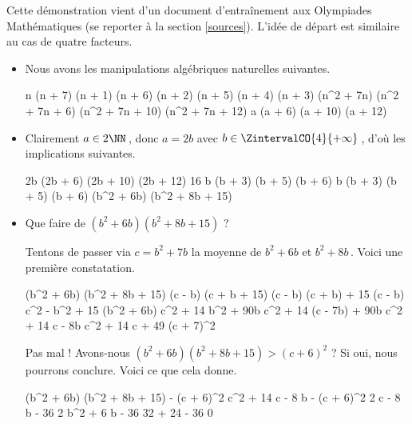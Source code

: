 Cette démonstration vient d'un document d'entraînement aux Olympiades Mathématiques (se reporter à la section \ref{sources}).
L'idée de départ est similaire au cas de quatre facteurs.

\begin{itemize}
	\item Nous avons les manipulations algébriques naturelles suivantes.

    \medskip
    \noindent\kern-6pt%
    \begin{stepcalc}[style = sar]
    \explnext{}
    	n (n + 7) \cdot (n + 1) (n + 6) \cdot (n + 2) (n + 5) \cdot (n + 4) (n + 3) 
    \explnext{}
    	(n^2 + 7n) (n^2 + 7n + 6) (n^2 + 7n + 10) (n^2 + 7n + 12) 
    	a (a + 6) (a + 10) (a + 12)
    \end{stepcalc}


	\item Clairement $a \in 2 \NN$\,, donc $a = 2b$ avec $b \in \ZintervalCO{4}{+\infty}$\,, d'où les implications suivantes.

    \medskip
    \noindent\kern-10pt%
    \begin{stepcalc}[style = ar*, ope=\implies]
    	 \in \NNssquare
    \explnext{}
    	2b (2b + 6) (2b + 10) (2b + 12) \in \NNssquare
    \explnext{}
    	16 b (b + 3) (b + 5) (b + 6) \in \NNssquare
    	b (b + 3) (b + 5) (b + 6) \in \NNssquare
    	(b^2 + 6b) (b^2 + 8b + 15) \in \NNssquare
    \end{stepcalc}


	\item Que faire de $(b^2 + 6b) (b^2 + 8b + 15)$ ?

    \smallskip
    \noindent%
    Tentons de passer via $c = b^2 + 7b$ la moyenne de $b^2 + 6b$ et $b^2 + 8b$\,. Voici une première constatation.

    \medskip
    \noindent\kern-10pt%
    \begin{stepcalc}[style = ar*]
    	(b^2 + 6b) (b^2 + 8b + 15)
    \explnext{}
    	(c - b) (c + b + 15)
    \explnext{}
    	(c - b) (c + b) + 15 (c - b)
    \explnext{}
    	c^2 - b^2 + 15 (b^2 + 6b)
    \explnext{}
    	c^2 + 14 b^2 + 90b
    \explnext{}
    	c^2 + 14 (c - 7b) + 90b
    \explnext{}
    	c^2 + 14 c - 8b
    \explnext[<]{}
    	c^2 + 14 c + 49
    \explnext[<]{}
    	(c + 7)^2
    \end{stepcalc}
    
    \smallskip
    \noindent
    Pas mal ! Avons-nous $(b^2 + 6b) (b^2 + 8b + 15) > (c + 6)^2$ ? Si oui, nous pourrons conclure. Voici ce que cela donne.

    \medskip
    \noindent\kern-10pt%
    \begin{stepcalc}[style = ar*]
    	(b^2 + 6b) (b^2 + 8b + 15) - (c + 6)^2
    \explnext{}
    	c^2 + 14 c - 8 b - (c + 6)^2
    \explnext{}
    	2 c - 8 b - 36
    \explnext{}
    	2 b^2 + 6 b - 36
    	32 + 24 - 36
    \explnext[>]{}
    	0
    \end{stepcalc}
\end{itemize}

\vspace{-2ex}	
\leavevmode